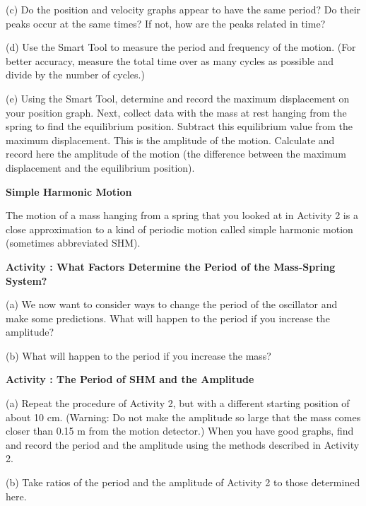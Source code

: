 (c) Do the position and velocity graphs appear to have the same period? Do their
peaks occur at the same times? If not, how are the peaks related in time?
\vspace{20mm}

(d) Use the Smart Tool to measure the period and frequency of the motion. (For
better accuracy, measure the total time over as many cycles as possible and
divide by the number of cycles.)
\vspace{30mm}

(e) Using the Smart Tool, determine and record the maximum displacement
on your position graph. 
Next, collect data with the mass at rest hanging from the spring to find the equilibrium position. 
Subtract  this equilibrium \newpage value from the maximum displacement.
This is the amplitude of the motion.
Calculate and record here the amplitude of
the motion (the difference between the maximum displacement and the equilibrium
position).
\vspace{30mm}

\textbf{Simple Harmonic Motion }

The motion of a mass hanging from a spring that you looked at in Activity 2
is a close approximation to a kind of periodic motion called simple harmonic
motion (sometimes abbreviated SHM).

\textbf{Activity  : What Factors Determine the Period of the Mass-Spring System? }

(a) We now want to consider ways to change the period of the oscillator and make some predictions.
What will happen to the period if you increase the amplitude? 
\vspace{25mm}

(b) What will happen to the period if you increase the mass?
\vspace{25mm}


\textbf{Activity  : The Period of SHM and the Amplitude} 

(a) Repeat the procedure of Activity 2, but with a different starting position
of about 10 cm. (Warning: Do not make the amplitude so large that the mass
comes closer than 0.15 m from the motion detector.) When you have good graphs,
find and record the period and the amplitude using the methods described in
Activity 2. 
\vspace{20mm}

(b) Take ratios of the period and the amplitude of Activity 2 to those determined
here.
\vspace{20mm}

